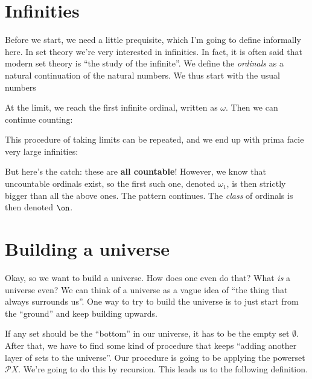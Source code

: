 \newcommand{\mytitle}{G\"odel's constructible universe -- seminar}



\section{Infinities}
Before we start, we need a little prequisite, which I'm going to define informally here. In set theory we're very interested in infinities. In fact, it is often said that modern set theory is ``the study of the infinite''. We define the \textit{ordinals} as a natural continuation of the natural numbers. We thus start with the usual numbers

At the limit, we reach the first infinite ordinal, written as $\omega$. Then we can continue counting:

This procedure of taking limits can be repeated, and we end up with prima facie very large infinities:

But here's the catch: these are \textbf{all countable}! However, we know that uncountable ordinals exist, so the first such one, denoted $\omega_1$, is then strictly bigger than all the above ones. The pattern continues. The \textit{class} of ordinals is then denoted $\on$.

\pagebreak
\section{Building a universe}
Okay, so we want to build a universe. How does one even do that? What \textit{is} a universe even? We can think of a universe as a vague idea of ``the thing that always surrounds us''. One way to try to build the universe is to just start from the ``ground'' and keep building upwards.

\qquad If any set should be the ``bottom'' in our universe, it has to be the empty set $\emptyset$. After that, we have to find some kind of procedure that keeps ``adding another layer of sets to the universe''. Our procedure is going to be applying the powerset $\mathcal PX$. We're going to do this by recursion. This leads us to the following definition.


